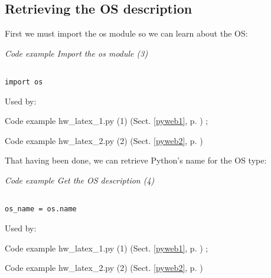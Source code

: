 \documentclass{article}
\begin{document}
\subsection{Retrieving the OS description}

First we must import the os module so we can learn about the OS:

\label{pyweb3}
    \begin{flushleft}
    \textit{Code example Import the os module (3)}
    \begin{Verbatim}[commandchars=\\\{\},codes={\catcode`$=3\catcode`^=7},frame=single]

import os

\end{Verbatim}

    \footnotesize
    Used by:
    \begin{list}{}{}
    
    \item Code example hw_latex_1.py (1) (Sect. \ref{pyweb1}, p. \pageref{pyweb1})
; 
    \item Code example hw_latex_2.py (2) (Sect. \ref{pyweb2}, p. \pageref{pyweb2})

    \end{list}
    \normalsize
\end{flushleft}


That having been done, we can retrieve Python's name for the OS type:

\label{pyweb4}
    \begin{flushleft}
    \textit{Code example Get the OS description (4)}
    \begin{Verbatim}[commandchars=\\\{\},codes={\catcode`$=3\catcode`^=7},frame=single]

os_name = os.name

\end{Verbatim}

    \footnotesize
    Used by:
    \begin{list}{}{}
    
    \item Code example hw_latex_1.py (1) (Sect. \ref{pyweb1}, p. \pageref{pyweb1})
; 
    \item Code example hw_latex_2.py (2) (Sect. \ref{pyweb2}, p. \pageref{pyweb2})

    \end{list}
    \normalsize
\end{flushleft}
\end{document}
